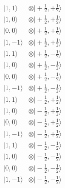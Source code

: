 \documentclass[a4paper,landscape]{article}
\begin{document}
\vspace{20px}
\begin{align*}
 \bigl|1,1\bigr\rangle        &\otimes \bigl|+\tfrac12,+\tfrac12\bigr\rangle\\
 \bigl|1,0\bigr\rangle        &\otimes \bigl|+\tfrac12,+\tfrac12\bigr\rangle\\
 \bigl|0,0\bigr\rangle        &\otimes \bigl|+\tfrac12,+\tfrac12\bigr\rangle\\
 \bigl|1,-1\bigr\rangle       &\otimes \bigl|+\tfrac12,+\tfrac12\bigr\rangle\\
 \bigl|1,1\bigr\rangle        &\otimes \bigl|+\tfrac12,-\tfrac12\bigr\rangle\\
 \bigl|1,0\bigr\rangle        &\otimes \bigl|+\tfrac12,-\tfrac12\bigr\rangle\\
 \bigl|0,0\bigr\rangle        &\otimes \bigl|+\tfrac12,-\tfrac12\bigr\rangle\\
 \bigl|1,-1\bigr\rangle       &\otimes \bigl|+\tfrac12,-\tfrac12\bigr\rangle\\
 \bigl|1,1\bigr\rangle        &\otimes \bigl|-\tfrac12,+\tfrac12\bigr\rangle\\
 \bigl|1,0\bigr\rangle        &\otimes \bigl|-\tfrac12,+\tfrac12\bigr\rangle\\
 \bigl|0,0\bigr\rangle        &\otimes \bigl|-\tfrac12,+\tfrac12\bigr\rangle\\
 \bigl|1,-1\bigr\rangle       &\otimes \bigl|-\tfrac12,+\tfrac12\bigr\rangle\\
 \bigl|1,1\bigr\rangle        &\otimes \bigl|-\tfrac12,-\tfrac12\bigr\rangle\\
 \bigl|1,0\bigr\rangle        &\otimes \bigl|-\tfrac12,-\tfrac12\bigr\rangle\\
 \bigl|0,0\bigr\rangle        &\otimes \bigl|-\tfrac12,-\tfrac12\bigr\rangle\\
 \bigl|1,-1\bigr\rangle       &\otimes \bigl|-\tfrac12,-\tfrac12\bigr\rangle
\end{align*}
\end{document}
